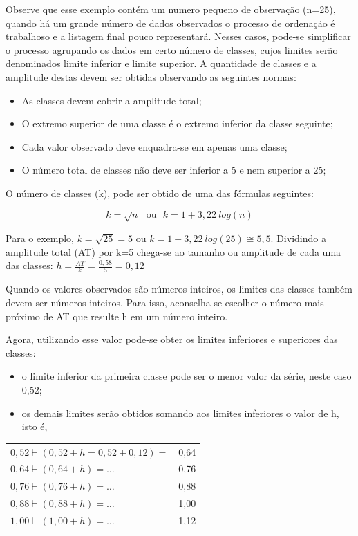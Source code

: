 Observe que esse exemplo contém um numero pequeno de observação (n=25), quando há um grande número de dados observados o processo de ordenação é trabalhoso e a listagem final pouco representará. Nesses casos, pode-se simplificar o processo agrupando os dados em certo número de classes, cujos limites serão denominados limite inferior e limite superior. A quantidade de classes e a amplitude destas devem ser obtidas observando as seguintes normas:


\newpage
\begin{itemize}
  \item As classes devem cobrir a amplitude total;
  \item O extremo superior de uma classe é o extremo inferior da classe seguinte;
  \item Cada valor observado deve enquadra-se em apenas uma classe;
  \item O número total de classes não deve ser inferior a 5 e nem superior a 25;
\end{itemize}


O número de classes (k), pode ser obtido de uma das fórmulas seguintes:

$$ k=\sqrt{n} \ \ \ \mbox{ou} \ \ \  k=1+3,22 \ log(n)$$



Para o exemplo, $k=\sqrt{25}=5$ ou $k=1-3,22 \ log(25)\cong 5,5$. Dividindo a amplitude total (AT) por k=5 chega-se ao tamanho ou amplitude de cada uma das classes: $h=\frac{AT}{k}=\frac{0,58}{5}=0,12$\vskip0.3cm


Quando os valores observados são números inteiros, os limites das classes também devem ser números inteiros. Para isso, aconselha-se escolher o número mais próximo de AT que resulte h em um número inteiro.\vskip0.3cm


Agora, utilizando esse valor pode-se obter os limites inferiores e superiores das classes:



\begin{itemize}
  \item o limite inferior da primeira classe pode ser o menor valor da série, neste caso 0,52;
  \item os demais limites serão obtidos somando aos limites inferiores o valor de h, isto é,
\end{itemize}

\begin{table}[!htb]
    \centering
    {
    \label{}
    \vspace{-0.5cm}
\begin{tabular}{l|c}
\hline\hline  
  $0,52 \vdash (0,52+ h=0,52+0,12)=$ & 0,64 \\
  $0,64 \vdash (0,64+ h)= \ldots $   & 0,76 \\
  $0,76 \vdash (0,76+ h)= \ldots $   & 0,88 \\
  $0,88 \vdash (0,88+ h)= \ldots $   & 1,00 \\
  $1,00 \vdash (1,00+ h)= \ldots $   & 1,12 \\
\hline\hline    
\end{tabular}}
\end{table}

